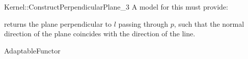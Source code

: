 \begin{ccRefFunctionObjectConcept}{Kernel::ConstructPerpendicularPlane_3}
A model for this must provide:


{returns the plane perpendicular to $l$ passing through $p$,
such that the normal direction of the plane coincides with the direction of
the line.}

\ccRefines
AdaptableFunctor

\ccSeeAlso
{} \\

\end{ccRefFunctionObjectConcept}
